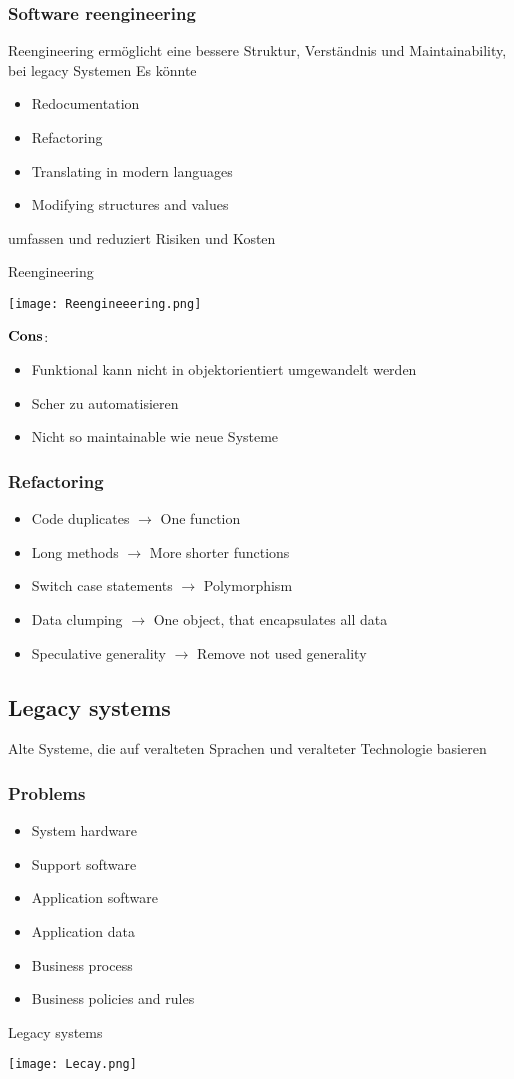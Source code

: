 \subsubsection{Software reengineering}
Reengineering ermöglicht eine bessere Struktur, Verständnis und Maintainability, bei legacy Systemen\newline
Es könnte
\begin{itemize}
	\item Redocumentation
	\item Refactoring
	\item Translating in modern languages
	\item Modifying structures and values 
\end{itemize}
umfassen und reduziert Risiken und Kosten
\begin{table}[H]
\caption{Reengineering}	
\texttt{[image: Reengineeering.png]}
\end{table}
$\bold{Cons}$:
\begin{itemize}
	\item Funktional kann nicht in objektorientiert umgewandelt werden
	\item Scher zu automatisieren
	\item Nicht so maintainable wie neue Systeme
\end{itemize}
\subsubsection{Refactoring}
\begin{itemize}
	\item Code duplicates $\to$ One function
	\item Long methods $\to$ More shorter functions
	\item Switch case statements $\to$ Polymorphism
	\item Data clumping $\to$ One object, that encapsulates all data
	\item Speculative generality $\to$ Remove not used generality
\end{itemize}
\subsection{Legacy systems}
Alte Systeme, die auf veralteten Sprachen und veralteter Technologie basieren
\subsubsection{Problems}
\begin{itemize}
	\item System hardware
	\item Support software
	\item Application software
	\item Application data
	\item Business process
	\item Business policies and rules
\end{itemize}
\begin{table}[H]
\caption{Legacy systems}
\texttt{[image: Lecay.png]}	
\end{table}
